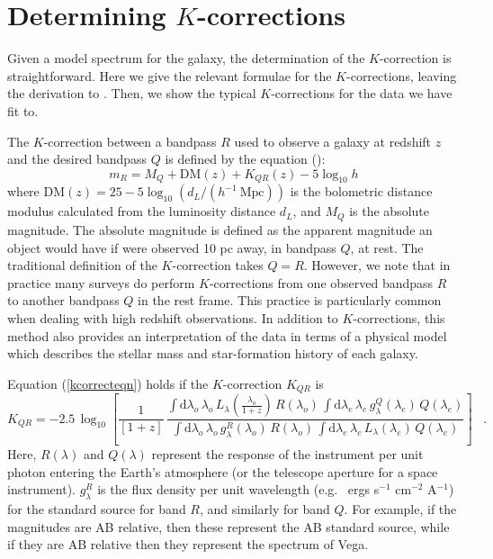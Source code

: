 \documentclass[10pt,preprint]{aastex}
\newcommand{\lambdaobs}{\lambda_o}
\newcommand{\lambdaemit}{\lambda_e}
\renewcommand{\AA}{A}
\begin{document}
\section{Determining $K$-corrections}
\label{kcorrect}

Given a model spectrum for the galaxy, the determination of the
$K$-correction is straightforward. Here we give the relevant formulae
for the $K$-corrections, leaving the derivation to \citet{hogg02a}.
Then, we show the typical $K$-corrections for the data we have fit
to. 

The $K$-correction between a bandpass $R$ used to observe a galaxy at
redshift $z$ and the desired bandpass $Q$ is defined by the equation
(\citealt{oke68a, hogg02a}):
\begin{equation}
\label{kcorrecteqn}
m_R = M_Q + \mathrm{DM}(z) + K_{QR}(z) - 5 \log_{10} h 
\end{equation}
where $\mathrm{DM}(z) = 25 - 5\log_{10} (d_L /
(h^{-1}{\mathrm{~Mpc}}))$ is the bolometric distance modulus
calculated from the luminosity distance $d_L$, and $M_Q$ is the
absolute magnitude. The absolute magnitude is defined as the apparent
magnitude an object would have if were observed 10 pc away, in
bandpass $Q$, at rest.  The traditional definition of the
$K$-correction takes $Q=R$. However, we note that in practice many
surveys do perform $K$-corrections from one observed bandpass $R$ to
another bandpass $Q$ in the rest frame. This practice is particularly
common when dealing with high redshift observations.  In addition to
$K$-corrections, this method also provides an interpretation of the
data in terms of a physical model which describes the stellar mass and
star-formation history of each galaxy.

Equation (\ref{kcorrecteqn}) holds if the $K$-correction $K_{QR}$ is
\begin{equation}
\label{eq:wavelengthL}
K_{QR} = -2.5\,\log_{10}\left[\frac{1}{[1+z]}\,
  \frac{\displaystyle
  \int\mathrm{d}\lambdaobs\,\lambdaobs\,L_{\lambda}\!\left(\frac{\lambdaobs}{1+z}\right)\,R(\lambdaobs)\,
    \int\mathrm{d}\lambdaemit\,\lambdaemit\,
    g^Q_{\lambda}(\lambdaemit)\,Q(\lambdaemit)}
       {\displaystyle
  \int\mathrm{d}\lambdaobs\,\lambdaobs\,g^R_{\lambda}(\lambdaobs)\,R(\lambdaobs)\,
    \int\mathrm{d}\lambdaemit\,\lambdaemit\,
    L_{\lambda}(\lambdaemit)\,Q(\lambdaemit)}
\right] \;\;\;.
\end{equation}
Here, $R(\lambda)$ and $Q(\lambda)$ represent the response of the
instrument per unit photon entering the Earth's atmosphere (or the
telescope aperture for a space instrument).  $g^R_\lambda$ is the flux
density per unit wavelength (e.g.~ ergs s$^{-1}$ cm$^{-2}$ \AA$^{-1}$)
for the standard source for band $R$, and similarly for band $Q$. For
example, if the magnitudes are AB relative, then these represent the
AB standard source, while if they are AB relative then they represent
the spectrum of Vega. 
\end{document}
